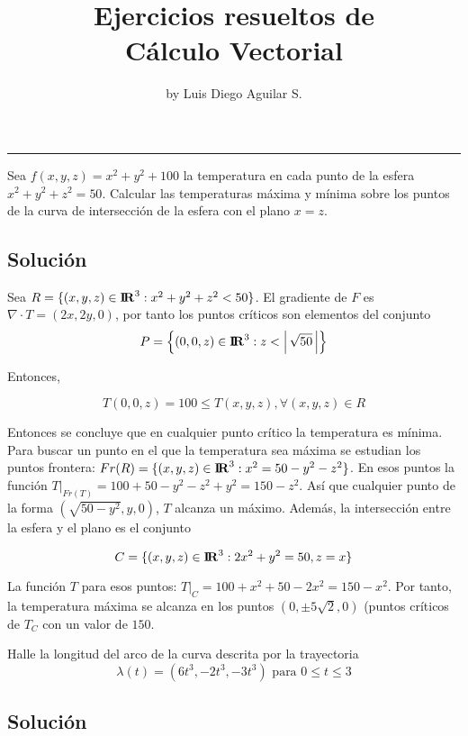 \documentclass{article}
\title{\sc Ejercicios resueltos de \\ Cálculo Vectorial}
\author{\adftripleflourishleft \,\,\, by Luis Diego Aguilar S. \,\,\,\adftripleflourishright}
\date{}
\begin{document}
\maketitle
\vspace{-1cm}
\bc\rule{50pt}{0.4pt}\ec
\vs\vp

\benu
\item Sea $f(x,y,z)=x^2+y^2+100$ la temperatura en cada punto de la esfera $x^2+y^2+z^2=50$. Calcular las temperaturas máxima y mínima sobre los puntos de la curva de intersección de la esfera con el plano $x=z$. \vs

\subsection*{\bf Solución}

Sea $R=\{(x, y, z) \in {\bf I\!R}^3:x^2+y^2+z^2 < 50\}$. El gradiente de $F$ es $\nabla\cdot T=(2x,2y,0)$, por tanto los puntos críticos son elementos del conjunto $$P=\left\{(0,0,z)\in {\bf I\!R}^3:z < \left\lvert\,\strut\sqrt{50}\,\right\rvert\right\}$$

Entonces, 

$$T(0,0,z)=100\leq T(x,y,z), \forall (x,y,z)\in R$$ 

\vs

Entonces se concluye que en cualquier punto crítico la temperatura es mínima. \\

Para buscar un punto en el que la temperatura sea máxima se estudian los puntos frontera: $Fr(R) = \{(x, y, z) \in {\bf I\!R}^3: x^2=50-y^2-z^2\}$. En esos puntos la función $T|_{Fr(T)}=100+50−y^2−z^2+y^2=150-z^2$. Así que cualquier punto de la forma $(\sqrt{50-y^2},y,0)$, $T$ alcanza un máximo. Además, la intersección entre la esfera y el plano es el conjunto 

$$C=\{(x, y, z)\in {\bf I\!R}^3:2x^2+y^2=50, z = x\}$$

\vs

La función $T$ para esos puntos: $T|_C=100+x^2+50−2x^2=150−x^2$. Por tanto, la temperatura máxima se alcanza en los puntos $(0, \pm 5\sqrt2,0)$ (puntos críticos de $T_C$ con un valor de $150$.

\newpage

\item Halle la longitud del arco de la curva descrita por la trayectoria $$\lambda(t)=(6t^3,-2t^3,-3t^3) \mbox{ para } 0\leq t\leq 3$$

\subsection*{\bf Solución}
\end{document}
